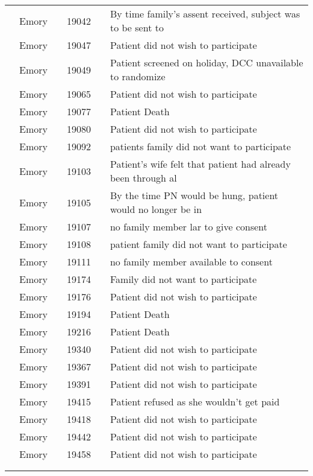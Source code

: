 \documentclass[dvips, 10pt]{article}
\begin{document}
\begin{table}[t]
\begin{center}
\begin{tabular}{ @{}l@{}
@{}l@{}@{}p{1.5em}@{}@{}c@{}@{}p{1.5em}@{}@{}l@{}
}
\\
& Emory && 19042 && By time family's assent received, subject was to be sent to \\
& Emory && 19047 && Patient did not wish to participate \\
& Emory && 19049 && Patient screened on holiday, DCC unavailable to randomize \\
& Emory && 19065 && Patient did not wish to participate \\
& Emory && 19077 && Patient Death \\
& Emory && 19080 && Patient did not wish to participate \\
& Emory && 19092 && patients family did not want to participate \\
& Emory && 19103 && Patient's wife felt that patient had already been through al \\
& Emory && 19105 && By the time PN would be hung, patient would no longer be in \\
& Emory && 19107 && no family member lar to give consent \\
& Emory && 19108 && patient family did not want to participate \\
& Emory && 19111 && no family member available to consent \\
& Emory && 19174 && Family did not want to participate \\
& Emory && 19176 && Patient did not wish to participate \\
& Emory && 19194 && Patient Death \\
& Emory && 19216 && Patient Death \\
& Emory && 19340 && Patient did not wish to participate \\
& Emory && 19367 && Patient did not wish to participate \\
& Emory && 19391 && Patient did not wish to participate \\
& Emory && 19415 && Patient refused as she wouldn't get paid \\
& Emory && 19418 && Patient did not wish to participate \\
& Emory && 19442 && Patient did not wish to participate \\
& Emory && 19458 && Patient did not wish to participate \\
\\
\hline \\

\end{tabular}

\end{center}
 \end{table}
\end{document}
